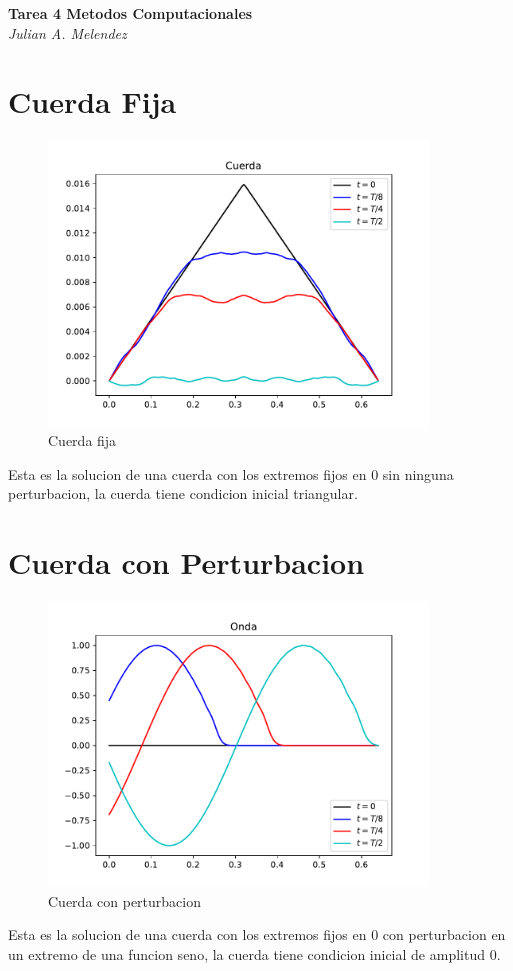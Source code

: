 \documentclass[letter]{article}
\begin{document}

\begin{center}
	\Large\textbf{Tarea 4 Metodos Computacionales}\\
	\large\textit{Julian A. Melendez}
\end{center}
\section{Cuerda Fija}
\begin{figure}[h]
  \centering
    \includegraphics[width=0.9\textwidth]{Cuerda.pdf}
	\caption{Cuerda fija}
\end{figure}
Esta es la solucion de una cuerda con los extremos fijos en 0 sin ninguna perturbacion, la cuerda tiene condicion inicial triangular. 

\newpage
\section{Cuerda con Perturbacion}
\begin{figure}[h]
  \centering
    \includegraphics[width=0.9\textwidth]{Onda.pdf}
	\caption{Cuerda con perturbacion}
\end{figure}
Esta es la solucion de una cuerda con los extremos fijos en 0 con perturbacion en un extremo de una funcion seno, la cuerda tiene condicion inicial de amplitud 0. 
\newpage
\end{document}
